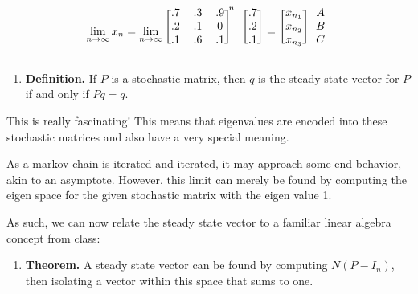 \documentclass{article}
\begin{document}
\begin{center}
    $$ \lim_{n\to\infty} x_n = 
    \lim_{n\to\infty}\begin{blockarray}{cccc}
        \begin{block}{[ccc]@{\hphantom{)}}l}
            .7&.3&.9&{\vphantom{)}}^n\\
            .2&.1& 0\\
            .1&.6&.1\\
        \end{block}
    \end{blockarray}
    \begin{blockarray}{c}
        \begin{block}{[c]} 
            .7\\
            .2\\
            .1\\ 
        \end{block}
    \end{blockarray}
    =
    \begin{blockarray}{cc}
        \begin{block}{[c]c} 
            x_{n_1} & A\\
            x_{n_2} & B\\
            x_{n_3} & C\\ 
        \end{block}
    \end{blockarray}
    $$
\end{center}

\begin{enumerate}[label=]
    \item \textbf{Definition.} If $P$ is a stochastic matrix, then $q$ is the steady-state vector for $P$ if and only if $Pq=q$.
\end{enumerate}

This is really fascinating! This means that eigenvalues are encoded into these stochastic matrices and also have a very special meaning. 

As a markov chain is iterated and iterated, it may approach some end behavior, akin to an asymptote. However, this limit can merely be found by computing the eigen space for the given stochastic matrix with the eigen value 1.

As such, we can now relate the steady state vector to a familiar linear algebra concept from class:

\begin{enumerate}[label=]
    \item \textbf{Theorem.} A steady state vector can be found by computing $N(P-I_n)$, then isolating a vector within this space that sums to one.
\end{enumerate}
\end{document}
